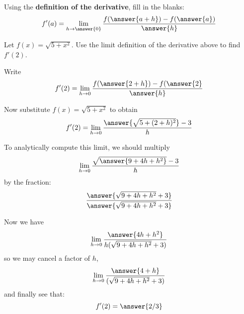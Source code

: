 \documentclass{ximera}
\begin{document}
\begin{exercise}

Using the \textbf{definition of the derivative}, fill in the blanks:
  \[
  f'(a)=
  \lim_{h\to\answer{0}}
  \frac{f(\answer{a+h})-f(\answer{a})}{\answer{h}}
  \]


\begin{exercise}
  Let $f(x)=\sqrt{5+x^2}$. Use the limit definition of the derivative
  above to find $f'(2)$.  
  \begin{exercise}
    Write
    \[
    f'(2) = \lim_{h\to 0}\frac{f(\answer{2+h}) -f(\answer{2}}{\answer{h}}
    \]
    \begin{exercise}
      Now substitute $f(x) = \sqrt{5+x^2}$ to obtain
      \[
      f'(2) = \lim_{h\to 0} \frac{\answer{\sqrt{5+(2+h)^2}}-3}{h}
      \]
      \begin{exercise}
        To analytically compute this limit, we should multiply
        \[
        \lim_{h\to 0} \frac{\sqrt{\answer{9+4h+h^2}}-3}{h}
        \]
        by the fraction:
        \[
        \frac{\answer{\sqrt{9+4h+h^2}+3}}{\answer{\sqrt{9+4h+h^2}+3}}
        \]
        \begin{exercise}
          Now we have 
          \[
          \lim_{h\to 0} \frac{\answer{4h+h^2}}{h(\sqrt{9+4h+h^2}+3)}
          \]
          so we may cancel a factor of $h$,
          \[
          \lim_{h\to 0} \frac{\answer{4+h}}{(\sqrt{9+4h+h^2}+3)}
          \]
          and finally see that:
          \[
          f'(2) = \answer{2/3}
          \]
        \end{exercise}
      \end{exercise}
    \end{exercise}
  \end{exercise}
\end{exercise}
\end{exercise}
\end{document}
